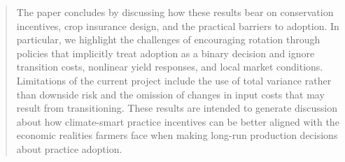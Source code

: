 \documentclass[12pt]{article}
\begin{document}
\begin{abstract}
The paper concludes by discussing how these results bear on conservation incentives, crop insurance design, and the practical barriers to adoption. In particular, we highlight the challenges of encouraging rotation through policies that implicitly treat adoption as a binary decision and ignore transition costs, nonlinear yield responses, and local market conditions. Limitations of the current project include the use of total variance rather than downside risk and the omission of changes in input costs that may result from transitioning. These results are intended to generate discussion about how climate-smart practice incentives can be better aligned with the economic realities farmers face when making long-run production decisions about practice adoption.

\end{abstract}
\end{document}
